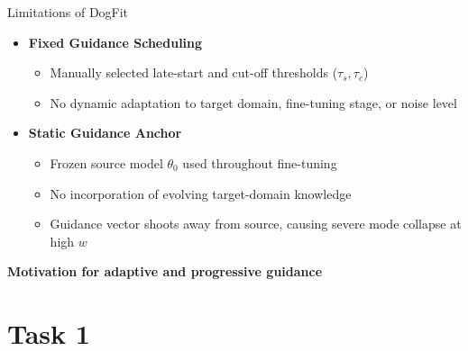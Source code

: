 \documentclass[aspectratio=169]{beamer}
\begin{document}
\begin{frame}{Limitations of DogFit}
    \begin{itemize}
        \item \textbf{Fixed Guidance Scheduling}
        \begin{itemize}
            \item Manually selected late-start and cut-off thresholds ($\tau_s, \tau_c$)
            \item No dynamic adaptation to target domain, fine-tuning stage, or noise level
        \end{itemize}

        \vspace{0.3cm}
        \item \textbf{Static Guidance Anchor}
        \begin{itemize}
            \item Frozen source model $\theta_0$ used throughout fine-tuning
            \item No incorporation of evolving target-domain knowledge
            \item Guidance vector shoots away from source, causing severe mode collapse at high $w$
        \end{itemize}
    \end{itemize}

    \vspace{0.3cm}
    \begin{center}
        \textbf{Motivation for adaptive and progressive guidance}
    \end{center}
\end{frame}

\section{Task 1}
\end{document}
